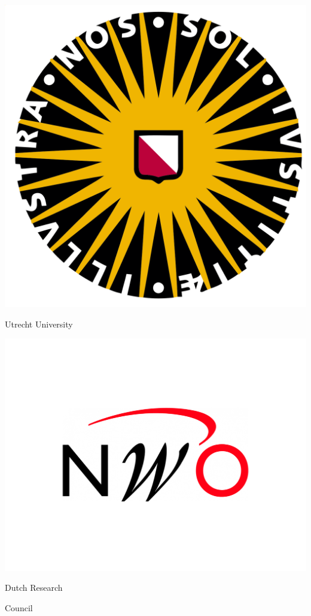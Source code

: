 \documentclass[a0paper,fleqn]{betterposter}
\begin{document}
{
\vfill
\begin{center}
    \vfill
    
    \includegraphics[scale=0.16]{img/uu.png}
    
    \color{black}Utrecht University
\end{center}
}
{
\vfill
\begin{center}
    \vfill 
    
    \includegraphics[trim={9cm 5cm 9cm 1cm},clip,scale=0.2]{img/NWO-logo.jpg}
    
    \color{black}Dutch Research 
    
    Council
    
\end{center}\hfill
}
\end{document}
